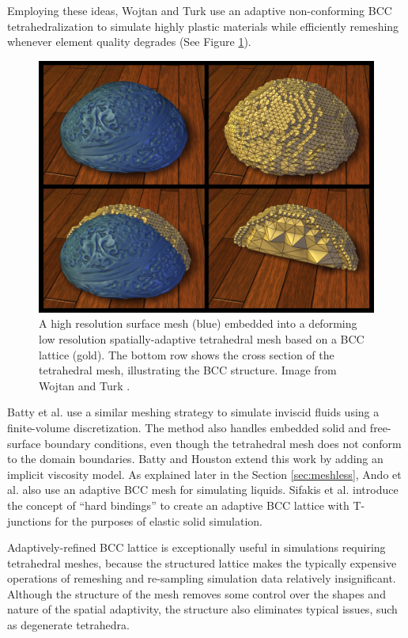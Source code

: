 Employing these ideas, Wojtan and Turk \cite{Wojtan2008} use an adaptive non-conforming BCC tetrahedralization to simulate highly plastic materials while efficiently remeshing whenever element quality degrades (See Figure \ref{fig:WT_BCC}). 
\begin{figure}[!h]
	\centering
	\includegraphics[width=0.8\linewidth]{images/starAdaptivity-cgf2016/WT2008_BCC.png}
	\caption[STAR adaptivity: Body-centered cubic mesh]{A high resolution surface mesh (blue) embedded into a deforming low resolution spatially-adaptive tetrahedral mesh based on a BCC lattice (gold). The bottom row shows the cross section of the tetrahedral mesh, illustrating the BCC structure. Image from Wojtan and Turk \cite{Wojtan2008}.}
	\label{fig:WT_BCC}
\end{figure}
Batty et al. \cite{Batty2010} use a similar meshing strategy to simulate inviscid fluids using a finite-volume discretization. The method also handles embedded solid and free-surface boundary conditions, even though the tetrahedral mesh does not conform to the domain boundaries. Batty and Houston \cite{Batty2011} extend this work by adding an implicit viscosity model. As explained later in the Section \ref{sec:meshless}, Ando et al. \cite{Ando2013} also use an adaptive BCC mesh for simulating liquids. Sifakis et al. \cite{Sifakis2007:Hybrid} introduce the concept of ``hard bindings'' to create an adaptive BCC lattice with T-junctions for the purposes of elastic solid simulation.

Adaptively-refined BCC lattice is exceptionally useful in simulations requiring tetrahedral meshes, because the structured lattice makes the typically expensive operations of remeshing and re-sampling simulation data relatively insignificant. Although the structure of the mesh removes some control over the shapes and nature of the spatial adaptivity, the structure also eliminates typical issues, such as degenerate tetrahedra.

